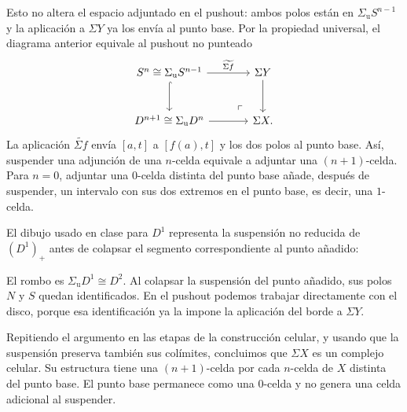 Esto no altera el espacio adjuntado en el pushout: ambos polos están en $\Sigma_{\mathrm u}S^{n-1}$ y la aplicación a $\Sigma Y$ ya los envía al punto base. Por la propiedad universal, el diagrama anterior equivale al pushout no punteado
\[
\begin{tikzcd}[column sep=large,row sep=large]
S^n\cong\Sigma_{\mathrm u}S^{n-1}
\arrow[r,"\widetilde{\Sigma f}"] \arrow[d,hook]
& \Sigma Y \arrow[d]\\
D^{n+1}\cong\Sigma_{\mathrm u}D^n \arrow[r]
& \Sigma X \arrow[ul,phantom,"\ulcorner",very near start].
\end{tikzcd}
\]
La aplicación $\widetilde{\Sigma f}$ envía $[a,t]$ a $[f(a),t]$ y los dos polos al punto base. Así, suspender una adjunción de una $n$-celda equivale a adjuntar una $(n+1)$-celda. Para $n=0$, adjuntar una $0$-celda distinta del punto base añade, después de suspender, un intervalo con sus dos extremos en el punto base, es decir, una $1$-celda.

El dibujo usado en clase para $D^1$ representa la suspensión no reducida de $(D^1)_+$ antes de colapsar el segmento correspondiente al punto añadido:
\begin{center}
\end{center}
El rombo es $\Sigma_{\mathrm u}D^1\cong D^2$. Al colapsar la suspensión del punto añadido, sus polos $N$ y $S$ quedan identificados. En el pushout podemos trabajar directamente con el disco, porque esa identificación ya la impone la aplicación del borde a $\Sigma Y$.

Repitiendo el argumento en las etapas de la construcción celular, y usando que la suspensión preserva también sus colímites, concluimos que $\Sigma X$ es un complejo celular. Su estructura tiene una $(n+1)$-celda por cada $n$-celda de $X$ distinta del punto base. El punto base permanece como una $0$-celda y no genera una celda adicional al suspender.

